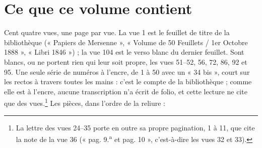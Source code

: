 \documentclass[11pt,a4paper]{article}
\begin{document}
\section*{Ce que ce volume contient}

Cent quatre vues, une page par vue. La vue 1 est le feuillet de titre de la
bibliothèque (« Papiers de Mersenne », « Volume de 50 Feuillets / 1er Octobre
1888 », « Libri 1846 ») ; la vue 104 est le verso blanc du dernier feuillet.
Sont blancs, ou ne portent rien qui leur soit propre, les vues 51–52, 56, 72, 86,
92 et 95. Une seule série de numéros à l'encre, de 1 à 50 avec un « 34 bis »,
court sur les rectos à travers toutes les mains : c'est le compte de la
bibliothèque ; comme elle est à l'encre, aucune transcription n'a écrit de
folio, et cette lecture ne cite que des vues.\footnote{La lettre des vues 24--35
porte en outre sa propre pagination, 1 à 11, que cite la note de la vue 36
(« pag. 9.\textsuperscript{a} et pag. 10 », c'est-à-dire les vues 32 et 33).}
Les pièces, dans l'ordre de la reliure :
\end{document}
